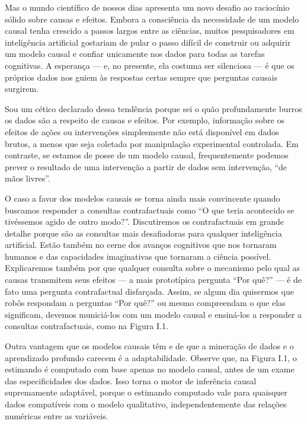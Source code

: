 \documentclass[11pt,a5paper,twoside]{book}
\begin{document}
Mas o mundo científico de nossos dias apresenta um novo desafio ao raciocínio sólido sobre causas e efeitos. Embora a consciência da necessidade de um modelo causal tenha crescido a passos largos entre as ciências, muitos pesquisadores em inteligência artificial gostariam de pular o passo difícil de construir ou adquirir um modelo causal e confiar unicamente nos dados para todas as tarefas cognitivas. A esperança — e, no presente, ela costuma ser silenciosa — é que os próprios dados nos guiem às respostas certas sempre que perguntas causais surgirem.

Sou um cético declarado dessa tendência porque sei o quão profundamente burros os dados são a respeito de causas e efeitos. Por exemplo, informação sobre os efeitos de ações ou intervenções simplesmente não está disponível em dados brutos, a menos que seja coletada por manipulação experimental controlada. Em contraste, se estamos de posse de um modelo causal, frequentemente podemos prever o resultado de uma intervenção a partir de dados sem intervenção, “de mãos livres”.

O caso a favor dos modelos causais se torna ainda mais convincente quando buscamos responder a consultas contrafactuais como “O que teria acontecido se tivéssemos agido de outro modo?”. Discutiremos os contrafactuais em grande detalhe porque são as consultas mais desafiadoras para qualquer inteligência artificial. Estão também no cerne dos avanços cognitivos que nos tornaram humanos e das capacidades imaginativas que tornaram a ciência possível. Explicaremos também por que qualquer consulta sobre o mecanismo pelo qual as causas transmitem seus efeitos — a mais prototípica pergunta “Por quê?” — é de fato uma pergunta contrafactual disfarçada. Assim, se algum dia quisermos que robôs respondam a perguntas “Por quê?” ou mesmo compreendam o que elas significam, devemos municiá-los com um modelo causal e ensiná-los a responder a consultas contrafactuais, como na Figura I.1.

Outra vantagem que os modelos causais têm e de que a mineração de dados e o aprendizado profundo carecem é a adaptabilidade. Observe que, na Figura I.1, o estimando é computado com base apenas no modelo causal, antes de um exame das especificidades dos dados. Isso torna o motor de inferência causal supremamente adaptável, porque o estimando computado vale para quaisquer dados compatíveis com o modelo qualitativo, independentemente das relações numéricas entre as variáveis.
\end{document}
